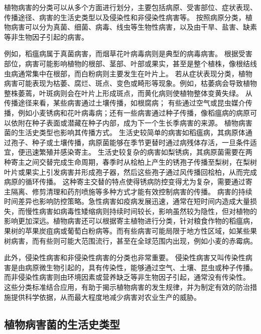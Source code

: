 \documentclass[AutoFakeBold]{LZUThesis-PgD&PhD}
\begin{document}
	植物病害的分类可以从多个方面进行划分，主要包括病原、受害部位、症状表现、传播途径、病害的生活史类型以及侵染性和非侵染性病害等。
	按照病原分类，植物病害可以分为真菌、细菌、病毒、线虫等生物性病害，以及由干旱、盐害、缺素等非生物因子引起的病害。
	
	例如，稻瘟病属于真菌病害，而烟草花叶病毒病则是典型的病毒病害。
	根据受害部位，病害可能影响植物的根部、茎部、叶部或果实，甚至是整个植株，像根结线虫病通常集中在根部，而白粉病则主要发生在叶片上。
	若从症状表现分类，植物病害可能表现为枯萎、腐烂、斑点、变色或畸形等现象。例如，枯萎病会导致植物整株萎蔫，叶斑病则会在叶片上形成斑点，而黄化病则使植物整体变黄失绿。
	从传播途径来看，某些病害通过土壤传播，如根腐病；
	有些通过空气或昆虫媒介传播，例如小麦锈病和花叶病毒病；还有一些病害通过种子传播，像稻瘟病的病原可以依附在种子表面或潜藏在种子内部，成为下一个生长季病害的来源。
	植物病害菌的生活史类型也影响其传播方式。
	生活史较简单的病害如稻瘟病，其病原体通过孢子、种子或土壤传播，病原菌能够在季节更替时通过病残体存活，一旦条件适宜，便迅速繁殖并感染寄主。
	生活史较复杂的病害如梨锈病，其病原菌需要在两种寄主之间交替完成生命周期，春季时从桧柏上产生的锈孢子传播至梨树，在梨树叶片或果实上引发病害并形成孢子器，然后这些孢子通过风传播回桧柏，从而完成病原的循环传播。
	这种寄主交替的特点使得锈病防控变得尤为复杂，需要通过寄主隔离、修剪清理和药剂喷施等多种方式才能有效控制病害的传播。
	病害的持续时间差异也影响防控策略。急性病害如疫病发展迅速，通常在短时间内造成大量损失，而慢性病害如病毒性矮缩病则持续时间较长，影响虽然较为隐性，但对植物的影响更加深远。植物病害还可以根据寄主植物进行分类，针对粮食作物的稻瘟病，果树的苹果炭疽病或葡萄白粉病等。而有些病害可能局限于地方性区域，如某些果树病害，而有些则可能大范围流行，甚至在全球范围内出现，例如小麦的赤霉病。
	
	
	此外，侵染性病害和非侵染性病害的分类也非常重要。
	侵染性病害又叫传染性病害是由病原微生物引起的，具有传染性，能够通过空气、土壤、昆虫或种子传播。
	而非侵染性病害则由环境因素或营养缺乏等非生物因子引起，通常没有传染性。
	这些分类标准结合应用，有助于揭示植物病害的发生规律，并为制定有效的防治措施提供科学依据，从而最大程度地减少病害对农业生产的威胁。
	
	\subsection{植物病害菌的生活史类型}
	
\end{document}
